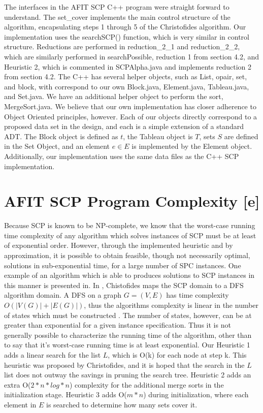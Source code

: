 \documentclass[12pt]{article}
\begin{document}
	The interfaces in the AFIT SCP C++ program were straight forward to understand. The set\_cover implements the main control structure of the algorithm, encapsulating steps 1 through 5 of the Christofides algorithm. Our implementation uses the searchSCP() function, which is very similar in control structure. Reductions are performed in reduction\_2\_1 and reduction\_2\_2, which are similarly performed in searchPossible, reduction 1 from section 4.2, and Heuristic 2, which is commented in SCPAlpha.java and implements reduction 2 from section 4.2. The C++ has several helper objects, such as List, opair, set, and block, with correspond to our own Block.java, Element.java, Tableau.java, and Set.java. We have an additional helper object to perform the sort, MergeSort.java. We believe that our own implementation has closer adherence to Object Oriented principles, however. Each of our objects directly correspond to a proposed data set in the design, and each is a simple extension of a standard ADT. The Block object is defined as $t$, the Tableau object is $T$, sets $S$ are defined in the Set Object, and an element $e \in E$ is implemented by the Element object. Additionally, our implementation uses the same data files as the C++ SCP implementation.
	
	
	\section{AFIT SCP Program Complexity [e]} \label{scn:complexity}
	
	Because SCP is known to be NP-complete, we know that the worst-case running time complexity of any algorithm which solves instances of SCP must be at least of exponential order. However, through the implemented heuristic and by approximation, it is possible to obtain feasible, though not necessarily optimal, solutions in sub-exponential time, for a large number of SPC instances. One example of an algorithm which is able to produces solutions to SCP instances in this manner is presented in\cite{graph_algorithms_cristofides}. In \cite{graph_algorithms_cristofides}, Chistofides maps the SCP domain to a DFS algorithm domain. A DFS on a graph $G=(V,E)$ has time complexity $O(|V(G)|+|E(G)|)$, thus the algorithms complexity is linear in the number of states which must be constructed \cite{AlgorithmsBook}. The number of states, however, can be at greater than exponential for a given instance specification. Thus it is not generally possible to characterize the running time of the algorithm, other than to say that it's worst-case running time is at least exponential.
	Our Heuristic 1 adds a linear search for the list $L$, which is O(k) for each node at step k. This heuristic was proposed by Christofides, and it is hoped that the search in the $L$ list does not outway the savings in pruning the search tree. Heuristic 2 adds an extra O($2 * n * log * n$) complexity for the additional merge sorts in the initialization stage. Heuristic 3 adds O($m * n$) during initialization, where each element in $E$ is searched to determine how many sets cover it.
	
\end{document}
